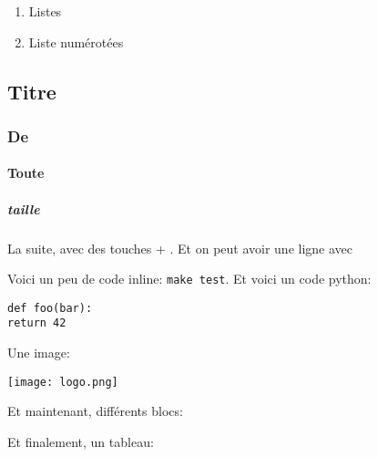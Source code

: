 \documentclass{zmdocument}
\begin{document}
\begin{enumerate}
\item Listes
\item Liste numérotées
\end{enumerate}

\subsection{Titre}
\subsubsection{De}
\paragraph{Toute}
\subparagraph{taille}

La suite, avec des touches  + . Et on peut avoir une ligne avec

\horizontalLine

Voici un peu de code inline: \verb`make test`. Et voici un code python:

\begin{verbatim}
def foo(bar):
return 42
\end{verbatim}

Une image: 

\begin{center}
\texttt{[image: logo.png]}
\end{center}

Et maintenant, différents blocs:

\begin{Information}
\blindtext
\end{Information}

\begin{Question}
\blindtext
\end{Question}

\begin{Warning}
\blindtext
\end{Warning}

\begin{Error}
\blindtext
\end{Error}

Et finalement, un tableau:
\end{document}
